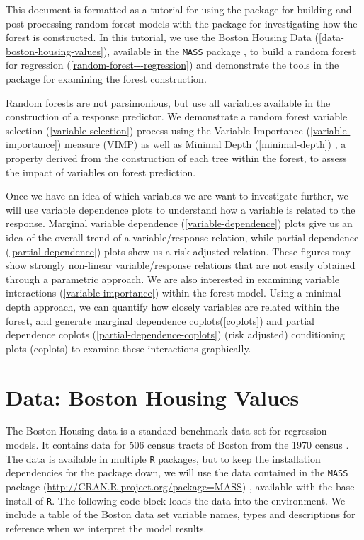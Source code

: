 \documentclass[article]{jss}
\begin{document}
This document is formatted as a tutorial for using the
 package for building and post-processing random
forest models with the  package for investigating
how the forest is constructed. In this tutorial, we use the Boston
Housing Data (\autoref{data-boston-housing-values}), available in the
\texttt{MASS} package \citep{mass:2002}, to build a random forest for
regression (\autoref{random-forest---regression}) and demonstrate the
tools in the  package for examining the forest
construction.

Random forests are not parsimonious, but use all variables available in
the construction of a response predictor. We demonstrate a random forest
variable selection (\autoref{variable-selection}) process using the
Variable Importance (\autoref{variable-importance}) measure (VIMP)
\citep{Breiman:2001} as well as Minimal Depth (\autoref{minimal-depth})
\citep{Ishwaran:2010}, a property derived from the construction of each
tree within the forest, to assess the impact of variables on forest
prediction.

Once we have an idea of which variables we are want to investigate
further, we will use variable dependence plots \citep{Friedman:2000} to
understand how a variable is related to the response. Marginal variable
dependence (\autoref{variable-dependence}) plots give us an idea of the
overall trend of a variable/response relation, while partial dependence
(\autoref{partial-dependence}) plots show us a risk adjusted relation.
These figures may show strongly non-linear variable/response relations
that are not easily obtained through a parametric approach. We are also
interested in examining variable interactions
(\autoref{variable-importance}) within the forest model. Using a minimal
depth approach, we can quantify how closely variables are related within
the forest, and generate marginal dependence coplots(\autoref{coplots})
and partial dependence coplots (\autoref{partial-dependence-coplots})
(risk adjusted) conditioning plots (coplots)
\citep[\citet{cleveland:1993}]{chambers:1992} to examine these
interactions graphically.

\hypertarget{data-boston-housing-values}{%
\section{Data: Boston Housing Values}\label{data-boston-housing-values}}

The Boston Housing data is a standard benchmark data set for regression
models. It contains data for 506 census tracts of Boston from the 1970
census \citep[\citet{Belsley:1980}]{Harrison:1978}. The data is
available in multiple \texttt{R} packages, but to keep the installation
dependencies for the  package down, we will use the
data contained in the \texttt{MASS} package
(\url{http://CRAN.R-project.org/package=MASS}) \citep{mass:2002},
available with the base install of \texttt{R}. The following code block
loads the data into the environment. We include a table of the Boston
data set variable names, types and descriptions for reference when we
interpret the model results.
\end{document}
